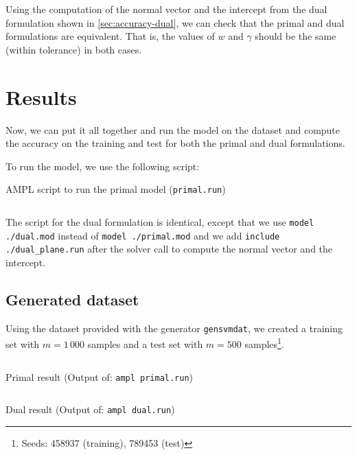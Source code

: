 Using the computation of the normal vector and the intercept
from the dual formulation shown in \cref{sec:accuracy-dual},
we can check that the primal and dual formulations are
equivalent. That is, the values of $w$ and $\gamma$ should be
the same (within tolerance) in both cases.


\pagebreak
\section{Results}

Now, we can put it all together and run the model on the
dataset and compute the accuracy on the training and test
for both the primal and dual formulations.

To run the model, we use the following script:
\begin{listing}[H]
    \caption{AMPL script to run the primal model (\texttt{primal.run})}
    \inputminted{ampl}{../ampl/primal.run}
\end{listing}

The script for the dual formulation is identical, except
that we use \texttt{model ./dual.mod} instead of
\texttt{model ./primal.mod} and we add 
\texttt{include ./dual_plane.run} after the
solver call to compute the normal vector and the intercept.


\pagebreak
\subsection{Generated dataset}

Using the dataset provided with the generator \texttt{gensvmdat},
we created a training set with $m=1\,000$ samples and a test set
with $m=500$ samples\footnote{Seeds: 458937 (training), 789453 (test)}.


\begin{listing}[H]
\inputminted[firstline=1,bgcolor=lightcodeBg]{text}{../outputs/primal.out}
\caption{Primal result (Output of: \texttt{ampl primal.run})}
\label{lst:res_primal}
\end{listing}

\begin{listing}[H]
\inputminted[firstline=1,bgcolor=lightcodeBg]{text}{../outputs/dual.out}
\caption{Dual result (Output of: \texttt{ampl dual.run})}
\label{lst:res_dual}
\end{listing}

